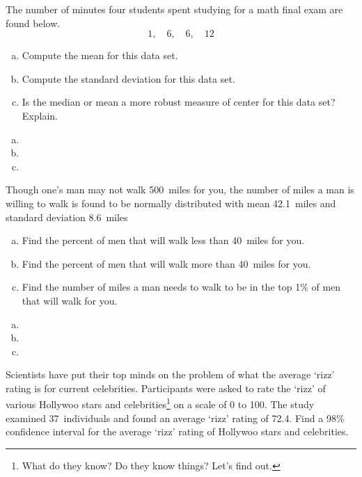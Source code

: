 \documentclass[12pt,letterpaper]{exam}
\begin{document}
\begin{questions}
\newpage
\question[10] The number of minutes four students spent studying for a math final exam are found below. 
	\[
	1, \quad 6, \quad 6, \quad 12
	\]

\begin{enumerate}[(a)]
\item Compute the mean for this data set.
\item Compute the standard deviation for this data set. 
\item Is the median or mean a more robust measure of center for this data set? Explain. 
\end{enumerate} \pspace

\sol 
\begin{enumerate}[(a)]
\item 
\item 
\item 
\end{enumerate}



\newpage
\question[10] Though one's man may not walk 500~miles for you, the number of miles a man is willing to walk is found to be normally distributed with mean 42.1~miles and standard deviation 8.6~miles
	\begin{enumerate}[(a)]
	\item Find the percent of men that will walk less than 40~miles for you.
	\item Find the percent of men that will walk more than 40~miles for you.
	\item Find the number of miles a man needs to walk to be in the top 1\% of men that will walk for you.
	\end{enumerate} \pspace

\sol 
\begin{enumerate}[(a)]
\item 
\item 
\item 
\end{enumerate}



\newpage
\question[10] Scientists have put their top minds on the problem of what the average `rizz' rating is for current celebrities. Participants were asked to rate the `rizz' of various Hollywoo stars and celebrities\footnote{What do they know? Do they know things? Let's find out.} on a scale of 0 to 100. The study examined 37~individuals and found an average `rizz' rating of 72.4. Find a 98\% confidence interval for the average `rizz' rating of Hollywoo stars and celebrities. \pspace


\end{questions}
\end{document}

